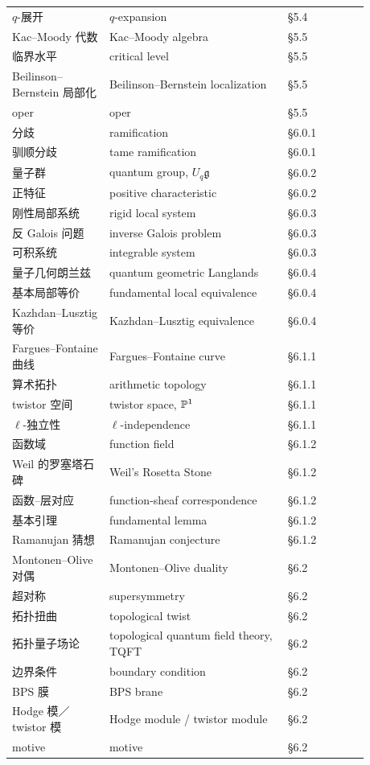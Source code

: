 \begin{center}
\begin{longtable}{@{}>{\raggedright\arraybackslash}p{0.24\linewidth}>{\raggedright\arraybackslash}p{0.44\linewidth}>{\raggedright\arraybackslash}p{0.20\linewidth}@{}}
$q$-展开 & $q$-expansion & §5.4 \\
Kac--Moody 代数 & Kac--Moody algebra & §5.5 \\
临界水平 & critical level & §5.5 \\
Beilinson--Bernstein 局部化 & Beilinson--Bernstein localization & §5.5 \\
oper & oper & §5.5 \\
分歧 & ramification & §6.0.1 \\
驯顺分歧 & tame ramification & §6.0.1 \\
量子群 & quantum group, $U_{q}\mathfrak{g}$ & §6.0.2 \\
正特征 & positive characteristic & §6.0.2 \\
刚性局部系统 & rigid local system & §6.0.3 \\
反 Galois 问题 & inverse Galois problem & §6.0.3 \\
可积系统 & integrable system & §6.0.3 \\
量子几何朗兰兹 & quantum geometric Langlands & §6.0.4 \\
基本局部等价 & fundamental local equivalence & §6.0.4 \\
Kazhdan--Lusztig 等价 & Kazhdan--Lusztig equivalence & §6.0.4 \\
Fargues--Fontaine 曲线 & Fargues--Fontaine curve & §6.1.1 \\
算术拓扑 & arithmetic topology & §6.1.1 \\
twistor 空间 & twistor space, $\mathbb{P}^{1}$ & §6.1.1 \\
$\ell$-独立性 & $\ell$-independence & §6.1.1 \\
函数域 & function field & §6.1.2 \\
Weil 的罗塞塔石碑 & Weil's Rosetta Stone & §6.1.2 \\
函数--层对应 & function-sheaf correspondence & §6.1.2 \\
基本引理 & fundamental lemma & §6.1.2 \\
Ramanujan 猜想 & Ramanujan conjecture & §6.1.2 \\
Montonen--Olive 对偶 & Montonen--Olive duality & §6.2 \\
超对称 & supersymmetry & §6.2 \\
拓扑扭曲 & topological twist & §6.2 \\
拓扑量子场论 & topological quantum field theory, TQFT & §6.2 \\
边界条件 & boundary condition & §6.2 \\
BPS 膜 & BPS brane & §6.2 \\
Hodge 模／twistor 模 & Hodge module / twistor module & §6.2 \\
motive & motive & §6.2 \\
\end{longtable}
\end{center}

